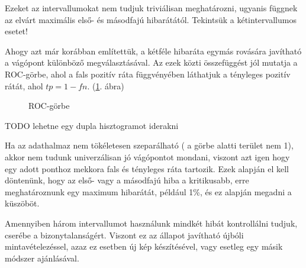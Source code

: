 Ezeket az intervallumokat nem tudjuk triviálisan meghatározni, ugyanis függnek az 
elvárt maximális első- és másodfajú hibarátától. Tekintsük a kétintervallumos esetet!

Ahogy azt már korábban említettük, a kétféle hibaráta egymás rovására javítható a 
vágópont különböző megválasztásával. Az ezek közti összefüggést jól mutatja a 
ROC-görbe, ahol a fals pozitív ráta függvényében láthatjuk a tényleges
pozitív rátát, ahol $ tp = 1 - fn $. 
(\ref{fig:roc.pelda}. ábra)


\begin{figure}[htbp]
	\centering
	
	\caption{ROC-görbe}
	\label{fig:roc.pelda}
\end{figure}


TODO lehetne egy dupla hisztogramot iderakni

Ha az adathalmaz nem tökéletesen szeparálható ( a görbe alatti terület nem 1), akkor
nem tudunk univerzálisan jó vágópontot mondani, viszont azt igen hogy egy adott ponthoz 
mekkora fals és tényleges ráta tartozik. Ezek alapján el kell döntenünk, hogy az 
első- vagy a másodfajú hiba a kritikusabb, erre meghatároznunk egy maximum hibarátát,
például 1\%, és ez alapján megadni a küszöböt.


Amennyiben három intervallumot használunk mindkét hibát kontrollálni tudjuk, cserébe a 
bizonytalanságért. Viszont ez az állapot javítható újbóli mintavételezéssel, azaz 
ez esetben új kép készítésével, vagy esetleg egy másik módszer ajánlásával.










%
%
%
%
%
%
%
%
%





